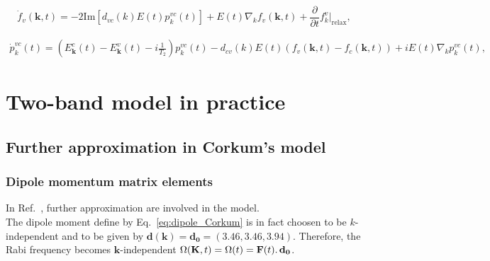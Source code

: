 \documentclass[a4paper,11pt]{report}
\renewcommand{\vec}[1]{\mathbf{#1}}
\begin{document}
 \begin{equation}
 \dot{f}_v(\vec{k},t) = -2\mathrm{Im}\left[ d_{vc}(k)E(t)p_k^{vc}(t)\right] + E(t)\nabla_k f_v(\vec{k},t) + \frac{\partial}{\partial t} f_{k}^{v}|_{\mathrm{relax}},
\end{equation}

\begin{eqnarray}
 \dot{p}^{vc}_k(t) = \left( E_\vec{k}^c(t) - E_\vec{k}^v(t) - i\frac{1}{T_2} \right) p_{k}^{vc}(t) - d_{cv}(k)E(t)\left(f_v(\vec{k},t)-f_c(\vec{k},t)\right)
 + iE(t)\nabla_k p_k^{vc}(t),
\end{eqnarray}

% 
% 
% 
%  

\section{Two-band model in practice}

\subsection{Further approximation in Corkum's model}

\subsubsection{Dipole momentum matrix elements}

In Ref.~\cite{PhysRevLett.113.073901}, further approximation are involved in the model.\\
The dipole moment define by Eq.~\ref{eq:dipole_Corkum} is in fact choosen to be $k$-independent and to be given by
$\vec{d}(\vec{k}) = \vec{d_0}= (3.46,3.46,3.94)$.
Therefore, the Rabi frequency becomes $\vec{k}$-independent $\Omega(\vec{K},t) = \Omega(t) = \vec{F}(t)\ldotp\vec{d_0}$.
\end{document}
